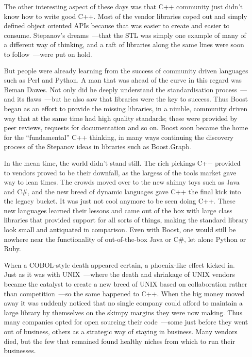 \documentclass{book}
\begin{document}
The other interesting aspect of these days was that C++ community just
didn't know how to write good C++. Most of the vendor libraries coped
out and simply defined object oriented APIs because that was easier to
create and easier to consume. Stepanov's dreams~---that the STL was
simply one example of many of a different way of thinking, and a raft
of libraries along the same lines were soon to follow~---were put on
hold.

But people were already learning from the success of community driven
languages such as Perl and Python. A man that was ahead of the curve
in this regard was Beman Dawes. Not only did he deeply understand the
standardisation process~---and its flaws~---but he also saw that
libraries were the key to success. Thus Boost began as an effort to
provide the missing libraries, in a nimble, community driven way that
at the same time had high quality standards; these were provided by
peer reviews, requests for documentation and so on. Boost soon became
the home for the ``fundamental'' C++ thinking, in many ways continuing
the discovery process of the Stepanov ideas in libraries such as
Boost.Graph.

In the mean time, the world didn't stand still. The rich pickings C++
provided to vendors proved to be their downfall, as the largess of the
tools market gave way to lean times. The crowds moved over to the new
shinny toys such as Java and C\#, and the new breed of dynamic
languages gave C++ the final kick into the legacy bucket. It was just
not cool anymore to be seen doing C++. These new languages learned
their lessons and came out of the box with large class libraries that
provided support for all sorts of things, making the standard library
look small and antiquated in comparison. Even with Boost, one would
still be nowhere near the functionality of out-of-the-box Java or C\#,
let alone Python or Ruby.

When a COBOL-style death appeared certain, a phoenix-like effect
kicked in. Just as it was with UNIX~---where the death and shrinkage of
UNIX vendors became the catalyst to create a new breed of UNIX based
on collaboration rather than competition~---so the same happened to
C++. When the big money moved away it was suddenly noticed that no
single company could afford to maintain a large library by themselves
on the skimpy margins they were now making. Thus many companies opted
for open sourcing their code~---some just before they went out of
business, others as a strategic way of staying in business. Many
vendors died, but the few that remained found healthy niches from
which to run their businesses.
\end{document}
